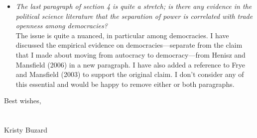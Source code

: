 \documentclass[12pt]{report}
\begin{document}
\begin{itemize}
  \item \textit{The last paragraph of section 4 is quite a stretch; is there any evidence in the political science literature that the separation of power is correlated with trade openness among democracies?} \\
	The issue is quite a nuanced, in particular among democracies. I have discussed the empirical evidence on democracies---separate from the claim that I made about moving from autocracy to democracy---from Henisz and Mansfield (2006) in a new paragraph. I have also added a reference to Frye and Mansfield (2003) to support the original claim. I don't consider any of this essential and would be happy to remove either or both paragraphs.
\end{itemize}


Best wishes,\\
\\
\\
Kristy Buzard
\end{document}
